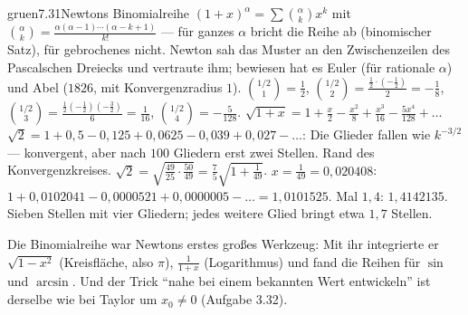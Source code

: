 \begin{loesungkarte}{gruen}{7.31}{Newtons Binomialreihe}
$(1 + x)^{\alpha} = \sum\binom\alpha kx^{k}$ mit $\binom\alpha k = \frac{\alpha(\alpha - 1)\cdots(\alpha - k + 1)}{k!}$ --- für ganzes $\alpha$ bricht die Reihe ab (binomischer Satz), für gebrochenes nicht. Newton sah das Muster an den Zwischenzeilen des Pascalschen Dreiecks und vertraute ihm; bewiesen hat es Euler (für rationale $\alpha$) und Abel ($1826$, mit Konvergenzradius $1$).
$\binom{1/2}1 = \frac12$, $\binom{1/2}2 = \frac{\frac12\cdot(-\frac12)}2 = -\frac18$, $\binom{1/2}3 = \frac{\frac12(-\frac12)(-\frac32)}6 = \frac1{16}$, $\binom{1/2}4 = -\frac5{128}$. $\sqrt{1 + x} = 1 + \frac x2 - \frac{x^{2}}8 + \frac{x^{3}}{16} - \frac{5x^{4}}{128} + \dots$
$\sqrt2 = 1 + 0{,}5 - 0{,}125 + 0{,}0625 - 0{,}039 + 0{,}027 - \dots$: Die Glieder fallen wie $k^{-3/2}$ --- konvergent, aber nach $100$ Gliedern erst zwei Stellen. Rand des Konvergenzkreises.
$\sqrt2 = \sqrt{\frac{49}{25}\cdot\frac{50}{49}} = \frac75\sqrt{1 + \frac1{49}}$. $x = \frac1{49} = 0{,}020408$: $1 + 0{,}0102041 - 0{,}0000521 + 0{,}0000005 - \dots = 1{,}0101525$. Mal $1{,}4$: $1{,}4142135$. Sieben Stellen mit vier Gliedern; jedes weitere Glied bringt etwa $1{,}7$ Stellen.
\begin{mitnehmen}\kastentext
Die Binomialreihe war Newtons erstes großes Werkzeug: Mit ihr integrierte er $\sqrt{1 - x^{2}}$ (Kreisfläche, also $\pi$), $\frac1{1 + x}$ (Logarithmus) und fand die Reihen für $\sin$ und $\arcsin$. Und der Trick \enquote{nahe bei einem bekannten Wert entwickeln} ist derselbe wie bei Taylor um $x_0\neq0$ (Aufgabe 3.32).
\end{mitnehmen}
\end{loesungkarte}

